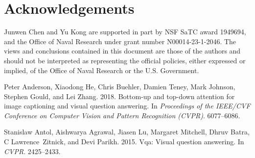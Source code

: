 \documentclass[sigconf]{acmart}
\begin{document}
\section{Acknowledgements}
Junwen Chen and Yu Kong are supported in part by NSF SaTC award 1949694, and the Office of Naval Research under grant number N00014-23-1-2046. The views and conclusions contained in this document are those of the authors and should not be interpreted as representing the official policies, either expressed or implied, of the Office of Naval Research or the U.S. Government.

\appendix




\begin{thebibliography}{65}



\ifx \showCODEN    \undefined {}     \fi
\ifx \showDOI      \undefined \def \showDOI       #1{#1}\fi
\ifx \showISBNx    \undefined \def \showISBNx     #1{\unskip}     \fi
\ifx \showISBNxiii \undefined \def \showISBNxiii  #1{\unskip}     \fi
\ifx \showISSN     \undefined \def \showISSN      #1{\unskip}     \fi
\ifx \showLCCN     \undefined \def \showLCCN      #1{\unskip}     \fi
\ifx \shownote     \undefined \def \shownote      #1{#1}          \fi
\ifx \showarticletitle \undefined \def \showarticletitle #1{#1}   \fi
\ifx \showURL      \undefined \def \showURL       {\relax}        \fi
\providecommand\bibfield[2]{#2}
\providecommand\bibinfo[2]{#2}
\providecommand\natexlab[1]{#1}
\providecommand\showeprint[2][]{arXiv:#2}

\bibfield{author}{\bibinfo{person}{Peter Anderson}, \bibinfo{person}{Xiaodong
  He}, \bibinfo{person}{Chris Buehler}, \bibinfo{person}{Damien Teney},
  \bibinfo{person}{Mark Johnson}, \bibinfo{person}{Stephen Gould}, {and}
  \bibinfo{person}{Lei Zhang}.} \bibinfo{year}{2018}\natexlab{}.
\newblock \showarticletitle{Bottom-up and top-down attention for image
  captioning and visual question answering}. In
  \bibinfo{booktitle}{\emph{Proceedings of the IEEE/CVF Conference on Computer
  Vision and Pattern Recognition (CVPR)}}. \bibinfo{pages}{6077--6086}.
\newblock


\bibfield{author}{\bibinfo{person}{Stanislaw Antol}, \bibinfo{person}{Aishwarya
  Agrawal}, \bibinfo{person}{Jiasen Lu}, \bibinfo{person}{Margaret Mitchell},
  \bibinfo{person}{Dhruv Batra}, \bibinfo{person}{C Lawrence~Zitnick}, {and}
  \bibinfo{person}{Devi Parikh}.} \bibinfo{year}{2015}\natexlab{}.
\newblock \showarticletitle{Vqa: Visual question answering}. In
  \bibinfo{booktitle}{\emph{CVPR}}. \bibinfo{pages}{2425--2433}.
\newblock



\end{thebibliography}
\end{document}
